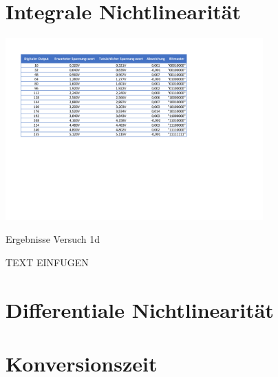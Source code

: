 \section{Integrale Nichtlinearität}


\begin{table}[H]
	\centering
	\includegraphics[height=7cm]{images/Versuch-1d.pdf} 
	\caption[]{Ergebnisse Versuch 1d}
\end{table}

TEXT EINFUGEN

\section{Differentiale Nichtlinearität}
\section{Konversionszeit}
